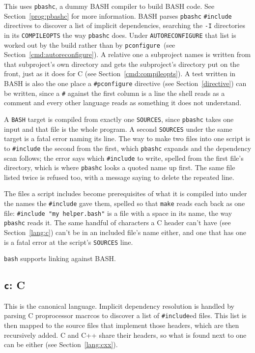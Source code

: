 \documentclass{article}
\newcommand{\pconfigure}{\texttt{pconfigure}}
\begin{document}
This uses \texttt{pbashc}, a dummy BASH compiler to build BASH code.
See Section~\ref{prog:pbashc} for more information.  BASH parses
\texttt{pbashc} \texttt{\#include} directives to discover a list of
implicit dependencies, searching the \texttt{-I} directories in its
\texttt{COMPILEOPTS} the way \texttt{pbashc} does.  Under
\texttt{AUTORECONFIGURE} that list is worked out by the build rather
than by \pconfigure\ (see Section~\ref{cmd:autoreconfigure}).  A relative one a
subproject names is written from that subproject's own directory and
gets the subproject's directory put on the front, just as it does for
C (see Section~\ref{cmd:compileopts}).  A test written in BASH is also the one place a
\texttt{\#pconfigure} directive (see Section~\ref{directive}) can be
written, since a \texttt{\#} against the first column is a line the
shell reads as a comment and every other language reads as something
it does not understand.

A \texttt{BASH} target is compiled from exactly one \texttt{SOURCES},
since \texttt{pbashc} takes one input and that file is the whole
program.  A second \texttt{SOURCES} under the same target is a fatal
error naming its line.  The way to make two files into one script is
to \texttt{\#include} the second from the first, which \texttt{pbashc}
expands and the dependency scan follows; the error says which
\texttt{\#include} to write, spelled from the first file's directory,
which is where \texttt{pbashc} looks a quoted name up first.  The same
file listed twice is refused too, with a message saying to delete the
repeated line.

The files a script includes become prerequisites of what it is
compiled into under the names the \texttt{\#include} gave them, spelled
so that \texttt{make} reads each back as one file: \texttt{\#include
"my helper.bash"} is a file with a space in its name, the way
\texttt{pbashc} reads it.  The same handful of characters a C header
can't have (see Section~\ref{lang:c}) can't be in an included file's
name either, and one that has one is a fatal error at the script's
\texttt{SOURCES} line.

\texttt{bash} supports linking against BASH.

\subsection{\texttt{c}: C \label{lang:c}}

This is the canonical language.  Implicit dependency resolution is
handled by parsing C proprocessor macrcos to discover a list of
\texttt{\#include}ed files.  This list is then mapped to the source
files that implement those headers, which are then recursively added.
C and C++ share their headers, so what is found next to one can be
either (see Section~\ref{lang:cxx}).
\end{document}
